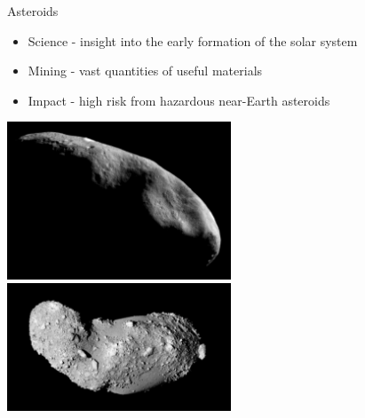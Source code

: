 \begin{frame}{Asteroids}
\begin{itemize}
    \item Science - insight into the early formation of the solar system
    \item Mining - vast quantities of useful materials
    \item Impact - high risk from hazardous near-Earth asteroids
\end{itemize}    

\begin{center}
    \includegraphics[width=0.5\textwidth,height=0.5\textheight,keepaspectratio]{figures/2016AAS/near_mos_20001203_full.jpg}
    ~
    \includegraphics[width=0.5\textwidth,height=0.5\textheight,keepaspectratio]{figures/2016AAS/Itokawa8_hayabusa_1210.jpg}
\end{center}
\end{frame}

